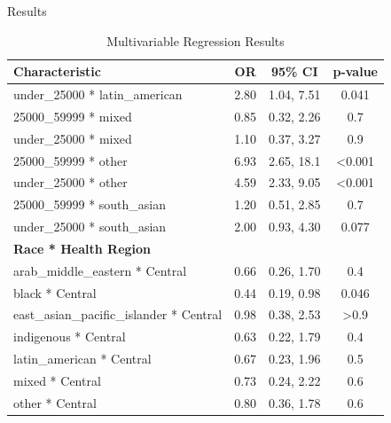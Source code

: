 \documentclass[
  ignorenonframetext,
]{beamer}
\begin{document}
\begin{frame}{Results}
\protect\hypertarget{results-1}{}
\tiny
\renewcommand{\arraystretch}{0.5}

\hypertarget{tbl-model1}{}
\begin{longtable}{lccc}
\caption{\label{tbl-model}Multivariable Regression Results}\tabularnewline

\toprule
\textbf{Characteristic} & \textbf{OR} & \textbf{95\% CI} & \textbf{p-value}\\
\midrule

\hspace{1em}under\_25000 * latin\_american & 2.80 & 1.04, 7.51 & 0.041\\
\hspace{1em}25000\_59999 * mixed & 0.85 & 0.32, 2.26 & 0.7\\
\hspace{1em}under\_25000 * mixed & 1.10 & 0.37, 3.27 & 0.9\\
\hspace{1em}25000\_59999 * other & 6.93 & 2.65, 18.1 & <0.001\\
\hspace{1em}under\_25000 * other & 4.59 & 2.33, 9.05 & <0.001\\
\hspace{1em}25000\_59999 * south\_asian & 1.20 & 0.51, 2.85 & 0.7\\
\hspace{1em}under\_25000 * south\_asian & 2.00 & 0.93, 4.30 & 0.077\\
\textbf{Race * Health Region} &  &  & \\
\hspace{1em}arab\_middle\_eastern * Central & 0.66 & 0.26, 1.70 & 0.4\\
\hspace{1em}black * Central & 0.44 & 0.19, 0.98 & 0.046\\
\hspace{1em}east\_asian\_pacific\_islander * Central & 0.98 & 0.38, 2.53 & >0.9\\
\hspace{1em}indigenous * Central & 0.63 & 0.22, 1.79 & 0.4\\
\hspace{1em}latin\_american * Central & 0.67 & 0.23, 1.96 & 0.5\\
\hspace{1em}mixed * Central & 0.73 & 0.24, 2.22 & 0.6\\
\hspace{1em}other * Central & 0.80 & 0.36, 1.78 & 0.6\\

\end{longtable}
\end{frame}
\end{document}
